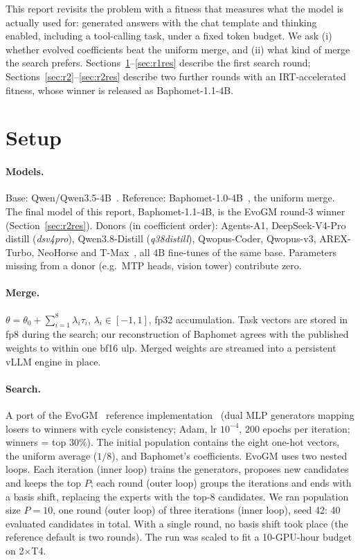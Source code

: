 \documentclass[10pt,a4paper]{article}
\begin{document}
This report revisits the problem with a fitness that measures what the model is actually used for: generated answers with the chat template and thinking enabled, including a tool-calling task, under a fixed token budget. We ask (i) whether evolved coefficients beat the uniform merge, and (ii) what kind of merge the search prefers. Sections~\ref{sec:r1setup}--\ref{sec:r1res} describe the first search round; Sections~\ref{sec:r2}--\ref{sec:r2res} describe two further rounds with an IRT-accelerated fitness, whose winner is released as Baphomet-1.1-4B.

\section{Setup}\label{sec:r1setup}
\paragraph{Models.} Base: Qwen/Qwen3.5-4B~\cite{qwen}. Reference: Baphomet-1.0-4B~\cite{baph}, the uniform merge. The final model of this report, Baphomet-1.1-4B, is the EvoGM round-3 winner (Section~\ref{sec:r2res}). Donors (in coefficient order): Agents-A1, DeepSeek-V4-Pro distill (\textit{dsv4pro}), Qwen3.8-Distill (\textit{q38distill}), Qwopus-Coder, Qwopus-v3, AREX-Turbo, NeoHorse and T-Max~\cite{m1,m2,m3,m4,m5,m6,m7,m8}, all 4B fine-tunes of the same base. Parameters missing from a donor (e.g.\ MTP heads, vision tower) contribute zero.

\paragraph{Merge.} $\theta=\theta_0+\sum_{i=1}^{8}\lambda_i\tau_i$, $\lambda_i\in[-1,1]$, fp32 accumulation. Task vectors are stored in fp8 during the search; our reconstruction of Baphomet agrees with the published weights to within one bf16 ulp. Merged weights are streamed into a persistent vLLM engine in place.

\paragraph{Search.} A port of the EvoGM~\cite{evogm} reference implementation~\cite{evogmcode} (dual MLP generators mapping losers to winners with cycle consistency; Adam, lr $10^{-4}$, 200 epochs per iteration; winners = top 30\%). The initial population contains the eight one-hot vectors, the uniform average ($1/8$), and Baphomet's coefficients. EvoGM uses two nested loops. Each iteration (inner loop) trains the generators, proposes new candidates and keeps the top $P$; each round (outer loop) groups the iterations and ends with a basis shift, replacing the experts with the top-8 candidates. We ran population size $P=10$, one round (outer loop) of three iterations (inner loop), seed 42: 40 evaluated candidates in total. With a single round, no basis shift took place (the reference default is two rounds). The run was scaled to fit a 10-GPU-hour budget on 2$\times$T4.
\end{document}

